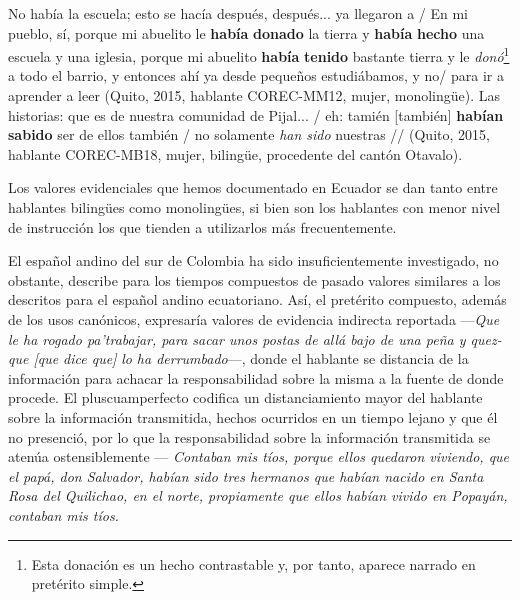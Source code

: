 \documentclass[output=paper]{../langscibook}
\begin{document}
\ea\label{ex:palacios:5}
\ea No había la escuela; esto se hacía después, después... ya llegaron a / En mi pueblo, sí, porque mi abuelito le \textbf{había} \textbf{donado} la tierra y \textbf{había} \textbf{hecho} una escuela y una iglesia, porque mi abuelito \textbf{había} \textbf{tenido} bastante tierra y le \textit{donó}\footnote{Esta donación es un hecho contrastable y, por tanto, aparece narrado en pretérito simple.} a todo el barrio, y entonces ahí ya desde pequeños estudiábamos, y no/ para ir a aprender a leer (Quito, 2015, hablante COREC-MM12, mujer, monolingüe).
\ex Las historias: que es de nuestra comunidad de Pijal... / eh: tamién [también] \textbf{habían} \textbf{sabido} ser de ellos también / no solamente \textit{han sido} nuestras // (Quito, 2015, hablante COREC-MB18, mujer, bilingüe, procedente del cantón Otavalo).
\z
\z

Los valores evidenciales que hemos documentado en Ecuador se dan tanto entre hablantes bilingües como monolingües, si bien son los hablantes con menor nivel de instrucción los que tienden a utilizarlos más frecuentemente.

El español andino del sur de Colombia ha sido insuficientemente investigado, no obstante,  \citet[172]{PortillaMelo2010} describe para los tiempos compuestos de pasado valores similares a los descritos para el español andino ecuatoriano. Así, el pretérito compuesto, además de los usos canónicos, expresaría valores de evidencia indirecta reportada ––\textit{Que le ha rogado pa’trabajar, para sacar unos postas de allá bajo de una peña y quez- que [que dice que]} \textit{lo ha derrumbado}––, donde el hablante se distancia de la información para achacar la responsabilidad sobre la misma a la fuente de donde procede. El pluscuamperfecto codifica un distanciamiento mayor del hablante sobre la información transmitida, hechos ocurridos en un tiempo lejano y que él no presenció, por lo que la responsabilidad sobre la información transmitida se atenúa ostensiblemente –– \textit{Contaban mis tíos, porque ellos quedaron viviendo, que el papá, don Salvador, habían sido tres hermanos que habían nacido en Santa Rosa del Quilichao, en el norte, propiamente que ellos habían vivido en Popayán, contaban mis tíos.}
\end{document}
